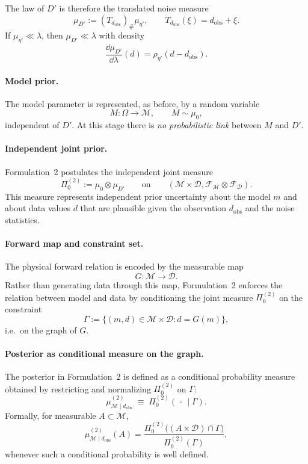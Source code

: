 \documentclass[11pt]{article}
\theoremstyle{remark}
\newcommand{\modelspace}{\mathcal{M}}
\newcommand{\dataspace}{\mathcal{D}}
\begin{document}
The law of \(D'\) is therefore the translated noise measure
\[
\mu_{D'} := (T_{d_{\mathrm{obs}}})_\# \mu_{\eta'},
\qquad
T_{d_{\mathrm{obs}}}(\xi)=d_{\mathrm{obs}}+\xi.
\]
If \(\mu_{\eta'}\ll\lambda\), then \(\mu_{D'}\ll\lambda\) with density
\[
\frac{\dd\mu_{D'}}{\dd\lambda}(d)
=
\rho_{\eta'}(d-d_{\mathrm{obs}}).
\]

\paragraph{Model prior.}
The model parameter is represented, as before, by a random variable
\[
M:\Omega\to\modelspace,
\qquad M\sim\mu_0,
\]
independent of \(D'\).  At this stage there is \emph{no probabilistic link}
between \(M\) and \(D'\).

\paragraph{Independent joint prior.}
Formulation~2 postulates the independent joint measure
\[
\Pi^{(2)}_0 := \mu_0 \otimes \mu_{D'}
\qquad\text{on}\qquad
(\modelspace\times\dataspace,
\mathcal{F}_{\modelspace}\otimes\mathcal{F}_{\dataspace}).
\]
This measure represents independent prior uncertainty about the model \(m\)
and about data values \(d\) that are plausible given the observation
\(d_{\mathrm{obs}}\) and the noise statistics.

\paragraph{Forward map and constraint set.}
The physical forward relation is encoded by the measurable map
\[
G:\modelspace\to\dataspace.
\]
Rather than generating data through this map, Formulation~2 enforces the
relation between model and data by conditioning the joint measure
\(\Pi^{(2)}_0\) on the constraint
\[
\Gamma := \{(m,d)\in\modelspace\times\dataspace : d = G(m)\},
\]
i.e.\ on the graph of \(G\).

\paragraph{Posterior as conditional measure on the graph.}
The posterior in Formulation~2 is defined as a conditional probability measure
obtained by restricting and normalizing \(\Pi^{(2)}_0\) on \(\Gamma\):
\[
\mu^{(2)}_{\modelspace\mid d_{\mathrm{obs}}}
\;\equiv\;
\Pi^{(2)}_0(\,\cdot\,\mid \Gamma).
\]
Formally, for measurable \(A\subset\modelspace\),
\[
\mu^{(2)}_{\modelspace\mid d_{\mathrm{obs}}}(A)
=
\frac{\Pi^{(2)}_0\bigl((A\times\dataspace)\cap\Gamma\bigr)}
{\Pi^{(2)}_0(\Gamma)},
\]
whenever such a conditional probability is well defined.
\end{document}
